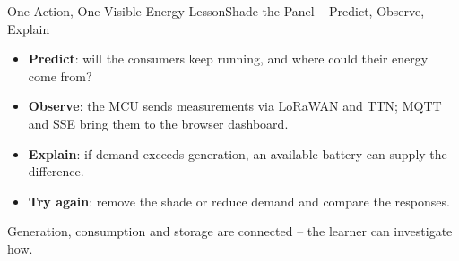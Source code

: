 \begin{frame}{One Action, One Visible Energy Lesson}{Shade the Panel -- Predict, Observe, Explain}
\begin{center}
\end{center}
\vspace{.6em}
\begin{itemize}
    \item \textbf{Predict}: will the consumers keep running, and where could their energy come from?
    \item \textbf{Observe}: the MCU sends measurements via LoRaWAN and TTN; MQTT and SSE bring them to the browser dashboard.
    \item \textbf{Explain}: if demand exceeds generation, an available battery can supply the difference.
    \item \textbf{Try again}: remove the shade or reduce demand and compare the responses.
\end{itemize}
\vfill
\alert{Generation, consumption and storage are connected -- the learner can investigate how.}
\par{}
\end{frame}

